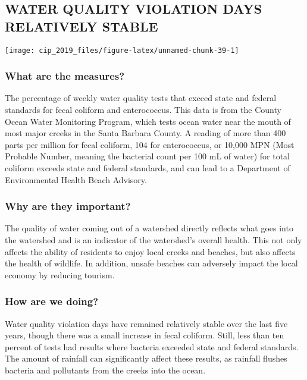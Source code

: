 \documentclass[]{book}
\theoremstyle{definition}
\theoremstyle{definition}
\theoremstyle{definition}
\theoremstyle{remark}
\begin{document}
\subsection*{WATER QUALITY VIOLATION DAYS RELATIVELY
STABLE}\label{water-quality-violation-days-relatively-stable}

\texttt{[image: cip\_2019\_files/figure-latex/unnamed-chunk-39-1]}

\subsubsection*{What are the measures?}\label{what-are-the-measures-5}

The percentage of weekly water quality tests that exceed state and
federal standards for fecal coliform and enterococcus. This data is from
the County Ocean Water Monitoring Program, which tests ocean water near
the mouth of most major creeks in the Santa Barbara County. A reading of
more than 400 parts per million for fecal coliform, 104 for
enterococcus, or 10,000 MPN (Most Probable Number, meaning the bacterial
count per 100 mL of water) for total coliform exceeds state and federal
standards, and can lead to a Department of Environmental Health Beach
Advisory.

\subsubsection*{Why are they important?}\label{why-are-they-important-4}

The quality of water coming out of a watershed directly reflects what
goes into the watershed and is an indicator of the watershed's overall
health. This not only affects the ability of residents to enjoy local
creeks and beaches, but also affects the health of wildlife. In
addition, unsafe beaches can adversely impact the local economy by
reducing tourism.

\subsubsection*{How are we doing?}\label{how-are-we-doing-22}

Water quality violation days have remained relatively stable over the
last five years, though there was a small increase in fecal coliform.
Still, less than ten percent of tests had results where bacteria
exceeded state and federal standards. The amount of rainfall can
significantly affect these results, as rainfall flushes bacteria and
pollutants from the creeks into the ocean.
\end{document}
